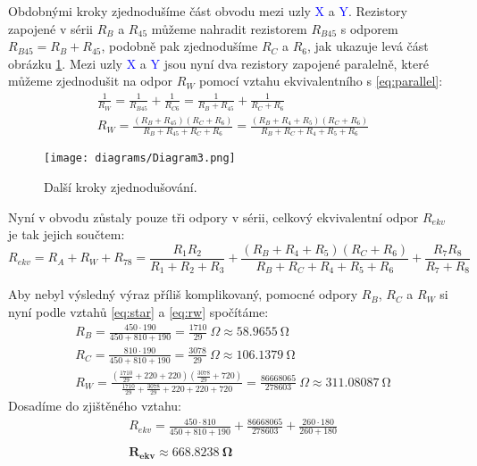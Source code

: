 Obdobnými kroky zjednodušíme část obvodu mezi uzly \textcolor{blue}{X} a \textcolor{blue}{Y}. Rezistory zapojené v sérii $R_B$ a $R_{45}$ můžeme nahradit rezistorem $R_{B45}$ s odporem $R_{B45} = R_B + R_{45}$, podobně pak zjednodušíme $R_C$ a $R_6$, jak ukazuje levá část obrázku \ref{fig:circ-1-3}. Mezi uzly \textcolor{blue}{X} a \textcolor{blue}{Y} jsou nyní dva rezistory zapojené paralelně, které můžeme zjednodušit na odpor $R_W$ pomocí vztahu ekvivalentního s \eqref{eq:parallel}:
\begin{equation}
    \label{eq:rw}
    \begin{gathered}
        \frac{1}{R_W} = \frac{1}{R_{B45}} + \frac{1}{R_{C6}} = \frac{1}{R_B+R_{45}} + \frac{1}{R_C+R_6} \\
        R_W = \frac{(R_B+R_{45})(R_C+R_6)}{R_B+R_{45}+R_C+R_6} = \frac{(R_B+R_4+R_5)(R_C+R_6)}{R_B+R_C+R_4+R_5+R_6}
    \end{gathered}
\end{equation} 

\begin{figure}[ht]
    \centering
    \texttt{[image: diagrams/Diagram3.png]}
    \caption{Další kroky zjednodušování.}
    \label{fig:circ-1-3}
\end{figure}

Nyní v obvodu zůstaly pouze tři odpory v sérii, celkový ekvivalentní odpor $R_{ekv}$ je tak jejich součtem:
\[
    R_{ekv} = R_A + R_W + R_{78} = \frac{R_1 R_2}{R_1 + R_2 + R_3} + \frac{(R_B+R_4+R_5)(R_C+R_6)}{R_B+R_C+R_4+R_5+R_6} + \frac{R_{7} R_{8}}{R_{7}+R_{8}}
\]

Aby nebyl výsledný výraz příliš komplikovaný, pomocné odpory $R_B$, $R_C$ a $R_W$ si nyní podle vztahů \eqref{eq:star} a \eqref{eq:rw} spočítáme:
\begin{gather*}
    R_B = \frac{450\cdot 190}{450+810+190} = \frac{1710}{29}\ \Omega \approx \SI{58.9655}{\ohm}\\
    R_C = \frac{810\cdot 190}{450+810+190} = \frac{3078}{29}\ \Omega \approx \SI{106.1379}{\ohm}\\
    R_W = \frac{(\frac{1710}{29} + 220 + 220)(\frac{3078}{29} + 720)}{\frac{1710}{29} + \frac{3078}{29} + 220 + 220 + 720} = \frac{\num{86668065}}{\num{278603}}\ \Omega \approx \SI{311.08087}{\ohm}
\end{gather*}
Dosadíme do zjištěného vztahu:
\begin{gather*}
    R_{ekv} = \frac{450\cdot 810}{450+810+190} + \frac{\num{86668065}}{\num{278603}} + \frac{260\cdot 180}{260+180} \\
    \\
    \mathbf{R_{ekv} \approx \SI{668.8238}{\ohm}}
\end{gather*}

